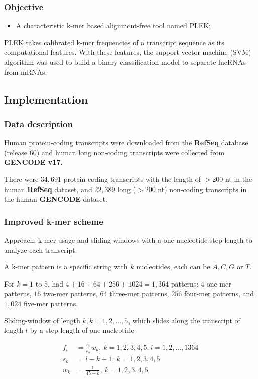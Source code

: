 \documentclass[hyperref={pdfpagelabels=false}]{beamer}
\begin{document}
\begin{frame}
\frametitle{Objective}
\begin{itemize}
 \item A characteristic k-mer based alignment-free tool named PLEK;\pause
\end{itemize}

\vspace{4px}

PLEK takes calibrated k-mer frequencies of a transcript sequence as its computational features. With these features, the support vector machine (SVM) algorithm was used to build a binary classification model to separate lncRNAs from mRNAs.

\end{frame}

\subsection{Implementation}
\begin{frame}
\frametitle{Data description}

Human protein-coding transcripts were downloaded from the \textbf{RefSeq} database (release 60) and human long non-coding transcripts were collected from \textbf{GENCODE v17}. \pause

There were $34,691$ protein-coding transcripts with the length of $>200$ nt in the human \textbf{RefSeq} dataset, and $22,389$ long ($>200$ nt) non-coding transcripts in the human \textbf{GENCODE} dataset.

\end{frame}


\begin{frame}
\frametitle{Improved k-mer scheme}
Approach:  k-mer usage and sliding-windows with a one-nucleotide step-length to analyze each transcript.\pause

A k-mer pattern is a specific string with $k$ nucleotides, each can be $A, C, G$ or $T$. \pause

For $k = 1$ to $5$, had $4 + 16 + 64 + 256 + 1024 = 1,364$ patterns: $4$ one-mer patterns, $16$ two-mer patterns, $64$ three-mer patterns, $256$ four-mer patterns, and $1,024$ five-mer patterns. \pause

Sliding-window of length $k, k = 1,2,...,5$, which slides along the transcript of length $l$ by a step-length of one nucleotide


\begin{align}
 f_i &= \frac{c_i}{s_k}w_k,~k=1,2,3,4,5.~ i=1,2,\dots,1364\\
 s_k &= l-k+1,~k=1,2,3,4,5\\
 w_k &= \frac{1}{4{5-k}},~k=1,2,3,4,5
\end{align}

\end{frame}
\end{document}
